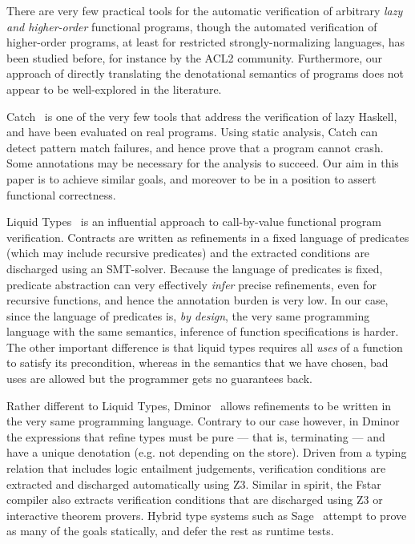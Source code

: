 There are very few practical tools for the automatic
verification of arbitrary {\em lazy and higher-order} functional programs, though 
the automated verification of higher-order programs, at least for restricted 
strongly-normalizing languages, has been studied before, for instance by the ACL2 
community. Furthermore, our approach of directly translating the denotational 
semantics of programs does not appear to be well-explored in the literature.

Catch~\cite{Mitchell:2008:PBE:1411286.1411293} is one of the very few tools that
address the verification of lazy Haskell, and have been evaluated on real programs.
Using static analysis, Catch can detect pattern match failures, and hence
prove that a program cannot crash. Some annotations may be necessary for the 
analysis to succeed. Our aim in this paper is to achieve similar goals, and
moreover to be in a position to assert functional correctness.

Liquid Types~\cite{Rondon:2008:LT:1375581.1375602} is an influential
approach to call-by-value functional program verification. 
Contracts are written as refinements in a fixed language of predicates (which may
include recursive predicates) and the extracted conditions are discharged using an
SMT-solver. Because the language of predicates is fixed, predicate abstraction can
very effectively {\em infer} precise refinements, even for recursive functions, and
hence the annotation burden is very low. In our case, since the language of predicates
is, {\em by design}, the very same programming language with the same semantics, inference
of function specifications is harder. The other important difference is that liquid types
requires all {\em uses} of a function to satisfy its precondition, whereas in the semantics
that we have chosen, bad uses are allowed but the programmer gets no guarantees back.

Rather different to Liquid Types, Dminor~\cite{Bierman+:subtyping} allows 
refinements to be written in the very same programming language.
Contrary to our case however, in Dminor
the expressions that refine types must be pure --- that is, terminating --- and have a unique
denotation (e.g. not depending on the store). 
Driven from a typing relation that includes
logic entailment judgements, verification conditions are extracted and discharged automatically using Z3.
Similar in spirit, the Fstar~\cite{fstar} compiler also extracts verification conditions 
that are discharged using Z3 or interactive theorem provers. Hybrid type systems such as 
Sage~\cite{Knowles+:sage} attempt to prove as many of the goals statically, and defer the 
rest as runtime tests.

